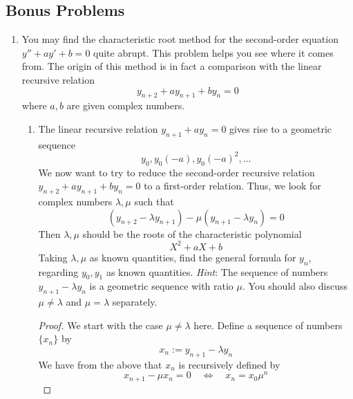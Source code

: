 \documentclass[../psets.tex]{subfiles}
\begin{document}
\subsection*{Bonus Problems}
\begin{enumerate}
    \item You may find the characteristic root method for the second-order equation $y''+ay'+b=0$ quite abrupt. This problem helps you see where it comes from. The origin of this method is in fact a comparison with the linear recursive relation
    \begin{equation*}
        y_{n+2}+ay_{n+1}+by_n = 0
    \end{equation*}
    where $a,b$ are given complex numbers.
    \begin{enumerate}
        \item The linear recursive relation $y_{n+1}+ay_n=0$ gives rise to a geometric sequence
        \begin{equation*}
            y_0,y_0(-a),y_0(-a)^2,\dots
        \end{equation*}
        We now want to try to reduce the second-order recursive relation $y_{n+2}+ay_{n+1}+by_n=0$ to a first-order relation. Thus, we look for complex numbers $\lambda,\mu$ such that
        \begin{equation*}
            (y_{n+2}-\lambda y_{n+1})-\mu(y_{n+1}-\lambda y_n) = 0
        \end{equation*}
        Then $\lambda,\mu$ should be the roots of the characteristic polynomial
        \begin{equation*}
            X^2+aX+b
        \end{equation*}
        Taking $\lambda,\mu$ as known quantities, find the general formula for $y_n$, regarding $y_0,y_1$ as known quantities. \emph{Hint}: The sequence of numbers $y_{n+1}-\lambda y_n$ is a geometric sequence with ratio $\mu$. You should also discuss $\mu\neq\lambda$ and $\mu=\lambda$ separately.
        \begin{proof}
            We start with the case $\mu\neq\lambda$ here. Define a sequence of numbers $\{x_n\}$ by
            \begin{equation*}
                x_n := y_{n+1}-\lambda y_n
            \end{equation*}
            We have from the above that $x_n$ is recursively defined by
            \begin{equation*}
                x_{n+1}-\mu x_n = 0
                \quad\Longleftrightarrow\quad
                x_n = x_0\mu^n

\end{equation*}
\end{proof}
\end{enumerate}
\end{enumerate}
\end{document}
